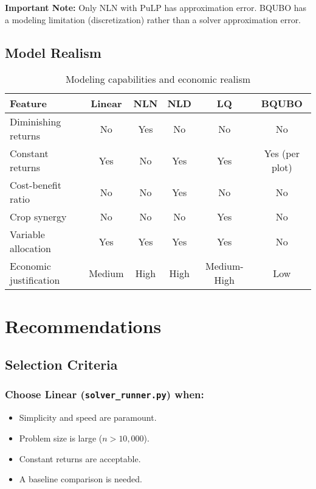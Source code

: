 \documentclass[11pt,a4paper]{article}
\begin{document}
\textbf{Important Note:} Only NLN with PuLP has approximation error. BQUBO has a modeling limitation (discretization) rather than a solver approximation error.

\subsection{Model Realism}

\begin{table}[h]
\centering
\caption{Modeling capabilities and economic realism}
\label{tab:realism}
\begin{tabular}{lccccc}
\toprule
\textbf{Feature} & \textbf{Linear} & \textbf{NLN} & \textbf{NLD} & \textbf{LQ} & \textbf{BQUBO} \\
\midrule
Diminishing returns & No & Yes & No & No & No \\
Constant returns & Yes & No & Yes & Yes & Yes (per plot) \\
Cost-benefit ratio & No & No & Yes & No & No \\
Crop synergy & No & No & No & Yes & No \\
Variable allocation & Yes & Yes & Yes & Yes & No \\
Economic justification & Medium & High & High & Medium-High & Low \\
\bottomrule
\end{tabular}
\end{table}

\section{Recommendations}

\subsection{Selection Criteria}

\subsubsection{Choose Linear (\texttt{solver\_runner.py}) when:}
\begin{itemize}
    \item Simplicity and speed are paramount.
    \item Problem size is large ($n > 10,000$).
    \item Constant returns are acceptable.
    \item A baseline comparison is needed.
\end{itemize}
\end{document}
